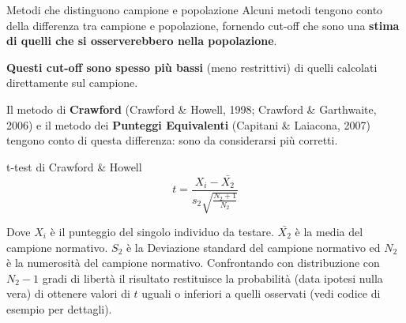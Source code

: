 \documentclass[
  ignorenonframetext,
  aspectratio=169,
]{beamer}
\begin{document}
\begin{frame}{Metodi che distinguono campione e popolazione}
\label{metodi-che-distinguono-campione-e-popolazione}
Alcuni metodi tengono conto della differenza tra campione e popolazione,
fornendo cut-off che sono una \textbf{stima di quelli che si
osserverebbero nella popolazione}.

\textbf{Questi cut-off sono spesso più bassi} (meno restrittivi) di
quelli calcolati direttamente sul campione.

Il metodo di \textbf{Crawford} (Crawford \& Howell, 1998; Crawford \&
Garthwaite, 2006) e il metodo dei \textbf{Punteggi Equivalenti}
(Capitani \& Laiacona, 2007) tengono conto di questa differenza: sono da
considerarsi più corretti.
\end{frame}


\begin{frame}{t-test di Crawford \& Howell}
\label{t-test-di-crawford-howell}
\[
t = \frac{X_i - \bar{X_2}}{s_2\sqrt{\frac{N_2+1}{N_2}}}
\]

\vspace{1em}

Dove \(X_i\) è il punteggio del singolo individuo da testare.
\(\bar{X_2}\) è la media del campione normativo. \(S_2\) è la Deviazione
standard del campione normativo ed \(N_2\) è la numerosità del campione
normativo. Confrontando con distribuzione con \(N_2-1\) gradi di libertà
il risultato restituisce la probabilità (data ipotesi nulla vera) di
ottenere valori di \(t\) uguali o inferiori a quelli osservati (vedi
codice di esempio per dettagli).
\end{frame}
\end{document}
